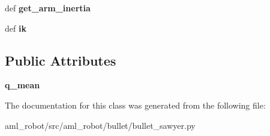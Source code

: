 \begin{DoxyCompactItemize}
\item 
\hypertarget{classaml__robot_1_1bullet_1_1bullet__sawyer_1_1_bullet_sawyer_arm_a95f29ec104db6c1b4ed3bac3bdcd3279}{def {\bfseries get\-\_\-arm\-\_\-inertia}}\label{classaml__robot_1_1bullet_1_1bullet__sawyer_1_1_bullet_sawyer_arm_a95f29ec104db6c1b4ed3bac3bdcd3279}

\item 
\hypertarget{classaml__robot_1_1bullet_1_1bullet__sawyer_1_1_bullet_sawyer_arm_a6743be6ef569bb14fd4c0f421288734f}{def {\bfseries ik}}\label{classaml__robot_1_1bullet_1_1bullet__sawyer_1_1_bullet_sawyer_arm_a6743be6ef569bb14fd4c0f421288734f}

\end{DoxyCompactItemize}
\subsection*{Public Attributes}
\begin{DoxyCompactItemize}
\item 
\hypertarget{classaml__robot_1_1bullet_1_1bullet__sawyer_1_1_bullet_sawyer_arm_aa0ed3d9640a342eeec9ffe729f514b88}{{\bfseries q\-\_\-mean}}\label{classaml__robot_1_1bullet_1_1bullet__sawyer_1_1_bullet_sawyer_arm_aa0ed3d9640a342eeec9ffe729f514b88}

\end{DoxyCompactItemize}


The documentation for this class was generated from the following file\-:\begin{DoxyCompactItemize}
\item 
aml\-\_\-robot/src/aml\-\_\-robot/bullet/bullet\-\_\-sawyer.\-py\end{DoxyCompactItemize}
